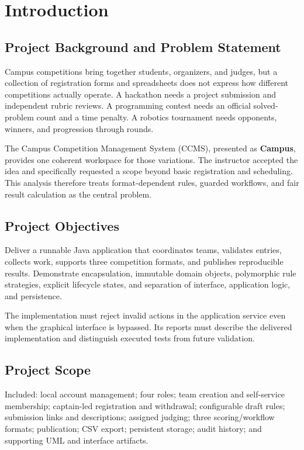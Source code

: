 \section{Introduction}
\subsection{Project Background and Problem Statement}
Campus competitions bring together students, organizers, and judges, but a collection of registration forms and spreadsheets does not express how different competitions actually operate. A hackathon needs a project submission and independent rubric reviews. A programming contest needs an official solved-problem count and a time penalty. A robotics tournament needs opponents, winners, and progression through rounds.

The Campus Competition Management System (CCMS), presented as \textbf{Campus}, provides one coherent workspace for those variations. The instructor accepted the idea and specifically requested a scope beyond basic registration and scheduling. This analysis therefore treats format-dependent rules, guarded workflows, and fair result calculation as the central problem.
\subsection{Project Objectives}
\begin{objectivebox}
Deliver a runnable Java application that coordinates teams, validates entries, collects work, supports three competition formats, and publishes reproducible results. Demonstrate encapsulation, immutable domain objects, polymorphic rule strategies, explicit lifecycle states, and separation of interface, application logic, and persistence.
\end{objectivebox}
The implementation must reject invalid actions in the application service even when the graphical interface is bypassed. Its reports must describe the delivered implementation and distinguish executed tests from future validation.
\subsection{Project Scope}
Included: local account management; four roles; team creation and self-service membership; captain-led registration and withdrawal; configurable draft rules; submission links and descriptions; assigned judging; three scoring/workflow formats; publication; CSV export; persistent storage; audit history; and supporting UML and interface artifacts.

